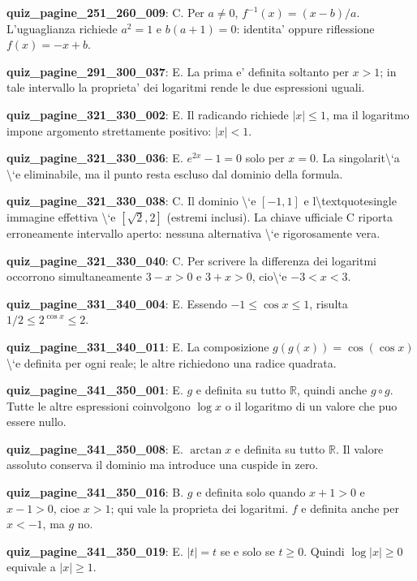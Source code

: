 \documentclass[11pt,a4paper]{article}
\newcounter{quiz}
\begin{document}
\noindent\textbf{quiz\_pagine\_251\_260\_009}: C. Per $a\ne0$, $f^{-1}(x)=(x-b)/a$. L'uguaglianza richiede $a^2=1$ e $b(a+1)=0$: identita' oppure riflessione $f(x)=-x+b$.\par\medskip
\noindent\textbf{quiz\_pagine\_291\_300\_037}: E. La prima e' definita soltanto per $x>1$; in tale intervallo la proprieta' dei logaritmi rende le due espressioni uguali.\par\medskip
\noindent\textbf{quiz\_pagine\_321\_330\_002}: E. Il radicando richiede $|x|\leq1$, ma il logaritmo impone argomento strettamente positivo: $|x|<1$.\par\medskip
\noindent\textbf{quiz\_pagine\_321\_330\_036}: E. $e^{2x}-1=0$ solo per $x=0$. La singolarit\textbackslash{}`a \textbackslash{}`e eliminabile, ma il punto resta escluso dal dominio della formula.\par\medskip
\noindent\textbf{quiz\_pagine\_321\_330\_038}: C. Il dominio \textbackslash{}`e $[-1,1]$ e l\textbackslash{}textquotesingle immagine effettiva \textbackslash{}`e $[\sqrt2,2]$ (estremi inclusi). La chiave ufficiale C riporta erroneamente intervallo aperto: nessuna alternativa \textbackslash{}`e rigorosamente vera.\par\medskip
\noindent\textbf{quiz\_pagine\_321\_330\_040}: C. Per scrivere la differenza dei logaritmi occorrono simultaneamente $3-x>0$ e $3+x>0$, cio\textbackslash{}`e $-3<x<3$.\par\medskip
\noindent\textbf{quiz\_pagine\_331\_340\_004}: E. Essendo $-1\leq\cos x\leq1$, risulta $1/2\leq2^{\cos x}\leq2$.\par\medskip
\noindent\textbf{quiz\_pagine\_331\_340\_011}: E. La composizione $g(g(x))=\cos(\cos x)$ \textbackslash{}`e definita per ogni reale; le altre richiedono una radice quadrata.\par\medskip
\noindent\textbf{quiz\_pagine\_341\_350\_001}: E. $g$ e definita su tutto $\mathbb R$, quindi anche $g\circ g$. Tutte le altre espressioni coinvolgono $\log x$ o il logaritmo di un valore che puo essere nullo.\par\medskip
\noindent\textbf{quiz\_pagine\_341\_350\_008}: E. $\arctan x$ e definita su tutto $\mathbb R$. Il valore assoluto conserva il dominio ma introduce una cuspide in zero.\par\medskip
\noindent\textbf{quiz\_pagine\_341\_350\_016}: B. $g$ e definita solo quando $x+1>0$ e $x-1>0$, cioe $x>1$; qui vale la proprieta dei logaritmi. $f$ e definita anche per $x<-1$, ma $g$ no.\par\medskip
\noindent\textbf{quiz\_pagine\_341\_350\_019}: E. $|t|=t$ se e solo se $t\geq0$. Quindi $\log|x|\geq0$ equivale a $|x|\geq1$.\par\medskip
\end{document}
